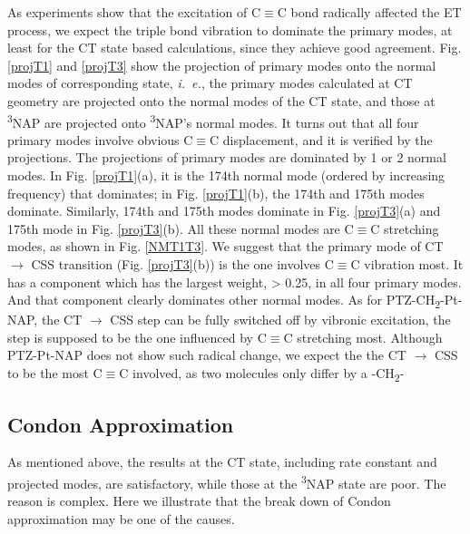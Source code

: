 As experiments show that the excitation of C$\equiv$C bond radically affected the ET process, we expect the triple bond vibration to dominate the primary modes, at least for the CT state based calculations, since they achieve good agreement. Fig. \ref{projT1} and \ref{projT3} show the projection of primary modes onto the normal modes of corresponding state, {\em i.~e.}, the primary modes calculated at CT geometry are projected onto the normal modes of the CT state, and those at \textsuperscript{3}NAP are projected onto \textsuperscript{3}NAP's normal modes. It turns out that all four primary modes involve obvious C$\equiv$C displacement, and it is verified by the projections. The projections of primary modes are dominated by 1 or 2 normal modes. In Fig. \ref{projT1}(a), it is the 174th normal mode (ordered by increasing frequency) that dominates; in Fig. \ref{projT1}(b), the 174th and 175th modes dominate. Similarly, 174th and 175th modes dominate in Fig. \ref{projT3}(a) and  175th mode in Fig. \ref{projT3}(b). All these normal modes are C$\equiv$C stretching modes, as shown in Fig. \ref{NMT1T3}. We suggest that the primary mode of  CT $\rightarrow$ CSS transition (Fig. \ref{projT3}(b)) is the one involves C$\equiv$C vibration most. It has a component which has the largest weight, > 0.25, in all four primary modes. And that component clearly dominates other normal modes. As for PTZ-CH\textsubscript{2}-Pt-NAP, the CT $\rightarrow$ CSS step can be fully switched off by vibronic excitation, the step is supposed to be the one influenced by C$\equiv$C stretching most. Although PTZ-Pt-NAP does not show such radical change, we expect the the CT $\rightarrow$ CSS to be the most C$\equiv$C involved, as two molecules only differ by a -CH\textsubscript{2}-






\subsection{Condon Approximation}

As mentioned above, the results at the CT state, including rate constant and projected modes, are satisfactory, while those at the \textsuperscript{3}NAP state are poor. The reason is complex. Here we illustrate that the break down of Condon approximation may be one of the causes.



